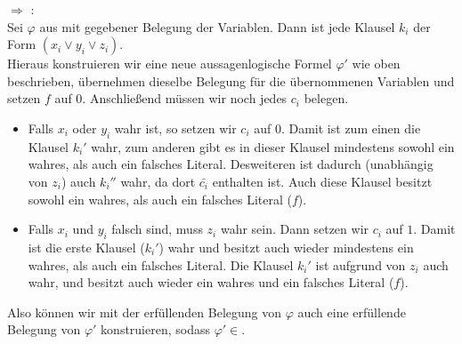 \documentclass[a4paper,11pt]{scrartcl}
\renewcommand{\phi}{\varphi}
\begin{document}
	 $\Rightarrow$ :\\
		Sei $\phi$ aus  mit gegebener Belegung der Variablen. Dann ist jede Klausel $k_i$ der Form $(x_i \lor y_i \lor z_i)$.\\
		Hieraus konstruieren wir eine neue aussagenlogische Formel $\phi '$ wie oben beschrieben, übernehmen dieselbe Belegung für die übernommenen Variablen und setzen $f$ auf $0$. Anschließend müssen wir noch jedes $c_i$ belegen.\\
		\begin{itemize}
		\item Falls $x_i$ oder $y_i$ wahr ist, so setzen wir $c_i$ auf $0$. Damit ist zum einen die Klausel $k_i'$ wahr, zum anderen gibt es in dieser Klausel mindestens sowohl ein wahres, als auch ein falsches Literal. Desweiteren ist dadurch (unabhängig von $z_i$) auch $k_i''$ wahr, da dort $\bar{c_i}$ enthalten ist. Auch diese Klausel besitzt sowohl ein wahres, als auch ein falsches Literal ($f$).
		
		\item Falls $x_i$ und $y_i$ falsch sind, muss $z_i$ wahr sein. Dann setzen wir $c_i$ auf $1$. Damit ist die erste Klausel ($k_i'$) wahr und besitzt auch wieder mindestens ein wahres, als auch ein falsches Literal. Die Klausel $k_i'$ ist aufgrund von $z_i$ auch wahr, und besitzt auch wieder ein wahres und ein falsches Literal ($f$).
		\end{itemize}
		Also können wir mit der erfüllenden Belegung von $\phi$ auch eine erfüllende Belegung von $\phi'$ konstruieren, sodass $\phi' \in$.\\
		
\end{document}
